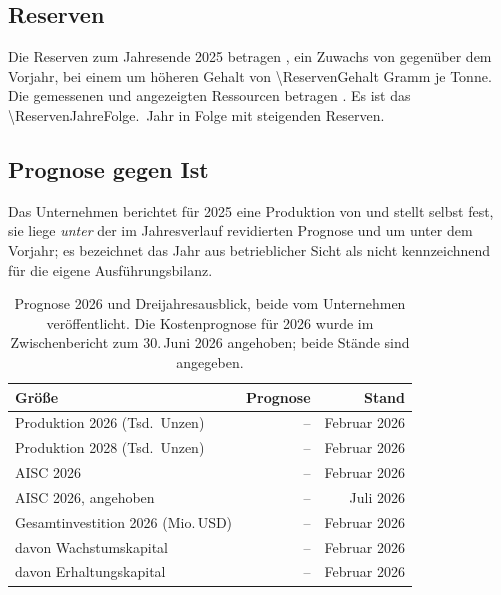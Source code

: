\subsection{Reserven}

Die Reserven zum Jahresende 2025 betragen \MozReserven{\Reserven}, ein
Zuwachs von \Pct{\ReservenDelta} gegen\"uber dem Vorjahr, bei einem um
\Pct{\ReservenGehaltPlus} h\"oheren Gehalt von \num{\ReservenGehalt} Gramm je Tonne. Die
gemessenen und angezeigten Ressourcen betragen
\MozReserven{\ResourcenMI}. Es ist das
\num{\ReservenJahreFolge}.\ Jahr in Folge mit steigenden
Reserven.

\subsection{Prognose gegen Ist}

Das Unternehmen berichtet f\"ur 2025 eine Produktion von
\Unzen{\ProduktionXXV} und stellt selbst fest, sie liege \emph{unter} der im
Jahresverlauf revidierten Prognose und um \Pct{\ProduktionRueckgangRund} unter dem Vorjahr; es
bezeichnet das Jahr aus betrieblicher Sicht als nicht kennzeichnend f\"ur die
eigene Ausf\"uhrungsbilanz.

\begin{table}[htbp]
\centering
\caption{Prognose 2026 und Dreijahresausblick, beide vom Unternehmen
ver\"offentlicht. Die Kostenprognose f\"ur 2026 wurde im Zwischenbericht zum
30.\,Juni 2026 angehoben; beide St\"ande sind angegeben.}
\label{tab:prognose}
\begin{tabular}{lrr}
\toprule
Gr\"o{\ss}e & Prognose & Stand\\
\midrule
Produktion 2026 (Tsd.\ Unzen) & \TsdUnzen{\PrognoseProdUnten}--\TsdUnzen{\PrognoseProdOben} & Februar 2026\\
Produktion 2028 (Tsd.\ Unzen) & \TsdUnzen{\ProgAchtProdUnten}--\TsdUnzen{\ProgAchtProdOben} & Februar 2026\\
AISC 2026 & \JeUnze{\PrognoseAiscUnten}--\JeUnze{\PrognoseAiscOben} & Februar 2026\\
AISC 2026, angehoben & \JeUnze{\PrognoseAiscUntenNeu}--\JeUnze{\PrognoseAiscObenNeu} & Juli 2026\\
Gesamtinvestition 2026 (Mio.\,USD) & \MioUSDexakt{\PrognoseCapexUnten}--\MioUSDexakt{\PrognoseCapexOben} & Februar 2026\\
davon Wachstumskapital & \MioUSDexakt{\PrognoseWachstumsCapexUnten}--\MioUSDexakt{\PrognoseWachstumsCapexOben} & Februar 2026\\
davon Erhaltungskapital & \MioUSDexakt{\PrognoseErhaltCapexUnten}--\MioUSDexakt{\PrognoseErhaltCapexOben} & Februar 2026\\
\bottomrule
\end{tabular}
\end{table}

